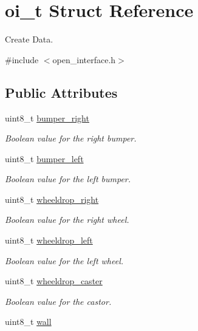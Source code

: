 \hypertarget{structoi__t}{
\section{oi\_\-t Struct Reference}
\label{structoi__t}
}


Create Data.  




{\ttfamily \#include $<$open\_\-interface.h$>$}

\subsection*{Public Attributes}
\begin{DoxyCompactItemize}
\item 
uint8\_\-t \hyperlink{structoi__t_ae796092f78ec2d01b15d4902153cbcdd}{bumper\_\-right}
\begin{DoxyCompactList}\small\item\em Boolean value for the right bumper. \end{DoxyCompactList}\item 
uint8\_\-t \hyperlink{structoi__t_a60914a17cbee5b368451499b5508375e}{bumper\_\-left}
\begin{DoxyCompactList}\small\item\em Boolean value for the left bumper. \end{DoxyCompactList}\item 
uint8\_\-t \hyperlink{structoi__t_ad9d421a68ea9d5432c154aed2e23900a}{wheeldrop\_\-right}
\begin{DoxyCompactList}\small\item\em Boolean value for the right wheel. \end{DoxyCompactList}\item 
uint8\_\-t \hyperlink{structoi__t_a0c3dbabeacf8660420721fb2340caac6}{wheeldrop\_\-left}
\begin{DoxyCompactList}\small\item\em Boolean value for the left wheel. \end{DoxyCompactList}\item 
uint8\_\-t \hyperlink{structoi__t_aa96535c384d724257df251e40583a1e8}{wheeldrop\_\-caster}
\begin{DoxyCompactList}\small\item\em Boolean value for the castor. \end{DoxyCompactList}\item 
uint8\_\-t \hyperlink{structoi__t_a1c9eafae94e169cf9a672af28619c4e6}{wall}

\end{DoxyCompactItemize}
